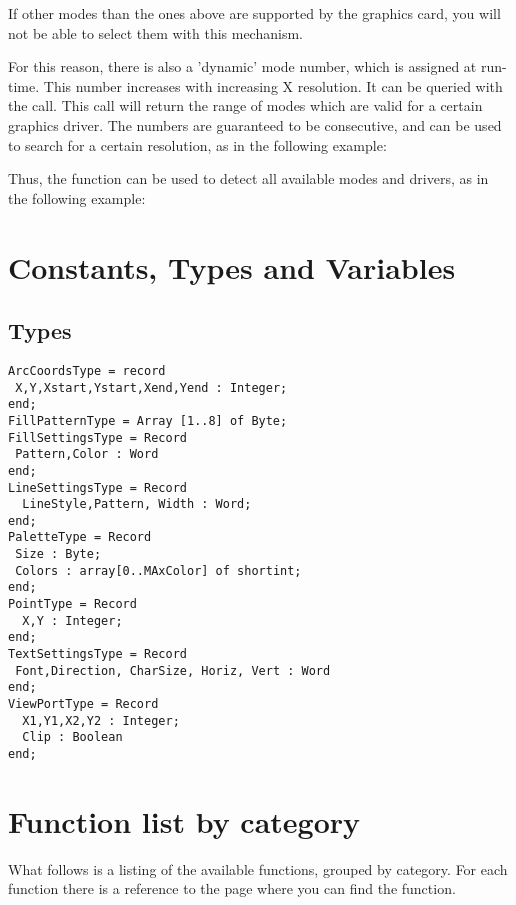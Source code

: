 
If other modes than the ones above are supported by the graphics card,
you will not be able to select them with this mechanism.

For this reason, there is also a 'dynamic' mode number, which is assigned at
run-time. This number increases with increasing X resolution. It can be
queried with the  call. This call will return the range
of modes which are valid for a certain graphics driver. The numbers are
guaranteed to be consecutive, and can be used to search for a certain 
resolution, as in the following example:



Thus, the  function can be used to detect all available 
modes and drivers, as in the following example:


\section{Constants, Types and Variables}
\subsection{Types}
\begin{verbatim}
ArcCoordsType = record
 X,Y,Xstart,Ystart,Xend,Yend : Integer;
end;
FillPatternType = Array [1..8] of Byte;
FillSettingsType = Record
 Pattern,Color : Word
end;
LineSettingsType = Record
  LineStyle,Pattern, Width : Word;
end;
PaletteType = Record
 Size : Byte;
 Colors : array[0..MAxColor] of shortint;
end;
PointType = Record
  X,Y : Integer;
end;
TextSettingsType = Record
 Font,Direction, CharSize, Horiz, Vert : Word
end;
ViewPortType = Record
  X1,Y1,X2,Y2 : Integer;
  Clip : Boolean
end;
\end{verbatim}

\section{Function list by category}
What follows is a listing of the available functions, grouped by category.
For each function there is a reference to the page where you can find the
function.
